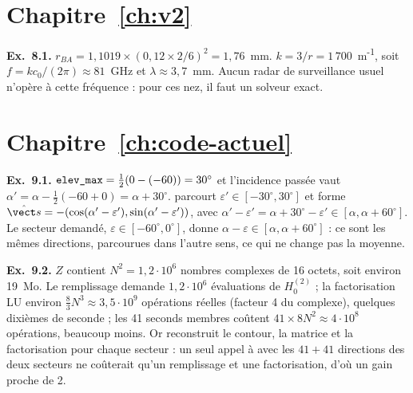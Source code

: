 \section*{Chapitre~\ref{ch:v2} }
\textbf{Ex.~8.1.} $r_{BA}=1{,}1019\times(0{,}12\times2/6)^2=1{,}76$~mm. $k=3/r=1\,700$~m\textsuperscript{-1}, soit $f=kc_0/(2\pi)\approx81$~GHz et $\lambda\approx3{,}7$~mm. Aucun radar de surveillance usuel n'opère à cette fréquence : pour ces nez, il faut un solveur exact.

\section*{Chapitre~\ref{ch:code-actuel} }
\textbf{Ex.~9.1.} $\texttt{elev\_max}=\tfrac12(0-(-60))=30^\circ$ et l'incidence passée vaut $\alpha'=\alpha-\tfrac12(-60+0)=\alpha+30^\circ$.  parcourt $\varepsilon'\in[-30^\circ,30^\circ]$ et forme $\shat=-(\cos(\alpha'-\varepsilon'),\sin(\alpha'-\varepsilon'))$, avec $\alpha'-\varepsilon'=\alpha+30^\circ-\varepsilon'\in[\alpha,\alpha+60^\circ]$. Le secteur demandé, $\varepsilon\in[-60^\circ,0^\circ]$, donne $\alpha-\varepsilon\in[\alpha,\alpha+60^\circ]$ : ce sont les mêmes directions, parcourues dans l'autre sens, ce qui ne change pas la moyenne.

\textbf{Ex.~9.2.} $Z$ contient $N^2=1{,}2\cdot10^6$ nombres complexes de 16 octets, soit environ 19~Mo. Le remplissage demande $1{,}2\cdot10^6$ évaluations de $H_0^{(2)}$ ; la factorisation LU environ $\tfrac{8}{3}N^3\approx3{,}5\cdot10^9$ opérations réelles (facteur 4 du complexe), quelques dixièmes de seconde ; les 41 seconds membres coûtent $41\times8N^2\approx4\cdot10^8$ opérations, beaucoup moins. Or  reconstruit le contour, la matrice et la factorisation pour chaque secteur : un seul appel à  avec les $41+41$ directions des deux secteurs ne coûterait qu'un remplissage et une factorisation, d'où un gain proche de 2.
